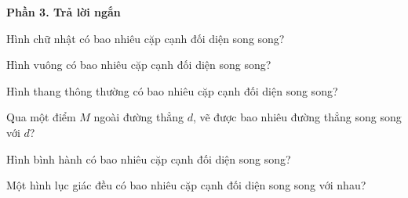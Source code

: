 \textbf{Phần 3. Trả lời ngắn}

\begin{ex} %
Hình chữ nhật có bao nhiêu cặp cạnh đối diện song song?
\end{ex}

\begin{ex} %
Hình vuông có bao nhiêu cặp cạnh đối diện song song?
\end{ex}

\begin{ex} %
Hình thang thông thường có bao nhiêu cặp cạnh đối diện song song?
\end{ex}

\begin{ex} %
Qua một điểm $M$ ngoài đường thẳng $d$, vẽ được bao nhiêu đường thẳng song song với $d$?
\end{ex}

\begin{ex} %
Hình bình hành có bao nhiêu cặp cạnh đối diện song song?
\end{ex}

\begin{ex} %
Một hình lục giác đều có bao nhiêu cặp cạnh đối diện song song với nhau?
\end{ex}
